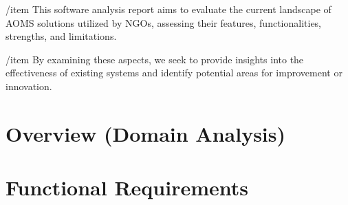 \documentclass[a4paper,12pt]{report}
\begin{document}
		/item This software analysis report aims to evaluate the current landscape of AOMS solutions utilized by NGOs, assessing their features, functionalities, strengths, and limitations. 
  		
    		/item By examining these aspects, we seek to provide insights into the effectiveness of existing systems and identify potential areas for improvement or innovation.
    
	\chapter{Overview (Domain Analysis)}
 		
	\chapter{Functional Requirements}
\end{document}
